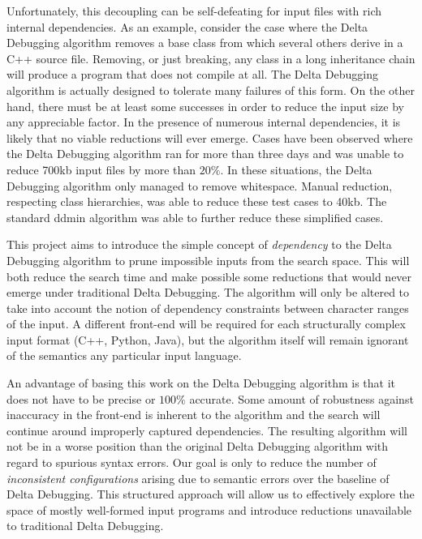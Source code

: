 \documentclass[preprint]{acm_proc_article-sp}
\begin{document}
Unfortunately, this decoupling can be self-defeating for input files with rich
internal dependencies. As an example, consider the case where the Delta
Debugging algorithm removes a base class from which several others derive in a
C++ source file. Removing, or just breaking, any class in a long inheritance
chain will produce a program that does not compile at all. The Delta Debugging
algorithm is actually designed to tolerate many failures of this form. On the
other hand, there must be at least some successes in order to reduce the input
size by any appreciable factor. In the presence of numerous internal
dependencies, it is likely that no viable reductions will ever emerge. Cases
have been observed \citep{trex} where the Delta Debugging algorithm ran for more
than three days and was unable to reduce 700kb input files by more than $20
\%$. In these situations, the Delta Debugging algorithm only managed to remove
whitespace.  Manual reduction, respecting class hierarchies, was able to reduce
these test cases to 40kb.  The standard ddmin algorithm was able to further
reduce these simplified cases.

This project aims to introduce the simple concept of \emph{dependency} to the
Delta Debugging algorithm to prune impossible inputs from the search space.
This will both reduce the search time and make possible some reductions that
would never emerge under traditional Delta Debugging. The algorithm will only be
altered to take into account the notion of dependency constraints between
character ranges of the input. A different front-end will be required for each
structurally complex input format (C++, Python, Java), but the algorithm itself
will remain ignorant of the semantics any particular input language.

An advantage of basing this work on the Delta Debugging algorithm is that it
does not have to be precise or $100 \%$ accurate. Some amount of robustness
against inaccuracy in the front-end is inherent to the algorithm and the search
will continue around improperly captured dependencies.  The resulting algorithm
will not be in a worse position than the original Delta Debugging algorithm with
regard to spurious syntax errors.  Our goal is only to reduce the number of
\emph{inconsistent configurations} \citep{zeller99} arising due to semantic
errors over the baseline of Delta Debugging. This structured approach will allow
us to effectively explore the space of mostly well-formed input programs and
introduce reductions unavailable to traditional Delta Debugging.
\end{document}
